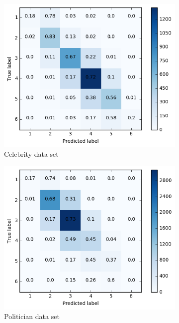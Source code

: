 \begin{figure}[h]
\begin{subfigure}{.5\textwidth}
  \includegraphics[width=.95\linewidth]{img/celeb_d1_cm_retweets}
  \caption{Celebrity data set}
  \label{fig:retw_distr_sub1}
\end{subfigure}%
\begin{subfigure}{.5\textwidth}
  \includegraphics[width=.95\linewidth]{img/polit_d1_cm_retweets}
  \caption{Politician data set}
  \label{fig:retw_distr_sub2}
\end{subfigure}
\begin{subfigure}{.5\textwidth}

\end{subfigure}
\end{figure}
